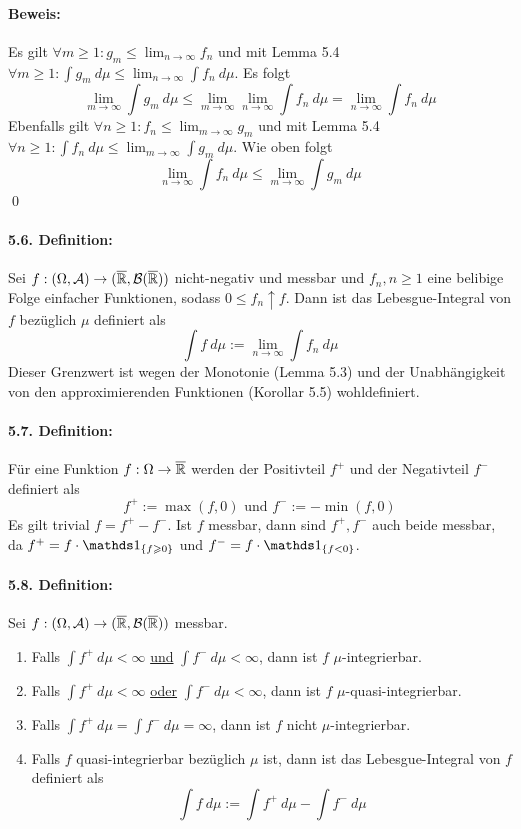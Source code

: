 \documentclass[12pt]{report}
\begin{document}
 \paragraph{Beweis:}Es gilt $\forall m\geq1:g_m\leq\displaystyle\lim_{n\to\infty}f_n$ und mit Lemma 5.4 $\displaystyle\forall m\geq1:\int g_m\ d\mu\leq\lim_{n\to\infty}\int f_n\ d\mu$. Es folgt 
 $$\lim_{m\to\infty}\int g_m\ d\mu\leq\lim_{m\to\infty}\lim_{n\to\infty}\int f_n\ d\mu=\lim_{n\to\infty}\int f_n\ d\mu$$
 Ebenfalls gilt $\forall n\geq1:f_n\leq\displaystyle\lim_{m\to\infty}g_m$ und mit Lemma 5.4 $\forall n\geq1:\displaystyle\int f_n\ d\mu\leq\lim_{m\to\infty}\int g_m\ d\mu$. Wie oben folgt
 $$\lim_{n\to\infty}\int f_n\ d\mu\leq\lim_{m\to\infty}\int g_m\ d\mu$$
 \qed
 
 \paragraph{5.6. Definition:}Sei $f:(\Omega,\mathcal{A})\to(\overline{\mathbb{R}},\mathcal{B}(\overline{\mathbb{R}}))$ nicht-negativ und messbar und $f_n,n\geq1$ eine belibige Folge einfacher Funktionen, sodass $0\leq f_n\uparrow f$. Dann ist das Lebesgue-Integral von $f$ bez\"uglich $\mu$ definiert als
 $$\int f\ d\mu:=\lim_{n\to\infty}\int f_n\ d\mu$$
 Dieser Grenzwert ist wegen der Monotonie (Lemma 5.3) und der Unabh\"angigkeit von den approximierenden Funktionen (Korollar 5.5) wohldefiniert. 
 
 \paragraph{5.7. Definition:}F\"ur eine Funktion $f:\Omega\to\overline{\mathbb{R}}$ werden der Positivteil $f^+$ und der Negativteil $f^-$ definiert als
 $$f^+:=\max(f,0)\text{ und }f^-:=-\min(f,0)$$
 Es gilt trivial $f=f^+-f^-$. Ist $f$ messbar, dann sind $f^+,f^-$ auch beide messbar, da $f^+=f\cdot\ind{\{f\geq0\}}$ und $f^-=f\cdot\ind{\{f<0\}}$.
 
 \paragraph{5.8. Definition:}Sei $f:(\Omega,\mathcal{A})\to(\overline{\mathbb{R}},\mathcal{B}(\overline{\mathbb{R}}))$ messbar.
 \begin{enumerate}[label=(\roman*)]
     \item Falls $\displaystyle\int f^+\ d\mu<\infty$ \underline{und} $\displaystyle\int f^-\ d\mu<\infty$, dann ist $f$ $\mu$-integrierbar.
     \item Falls $\displaystyle\int f^+\ d\mu<\infty$ \underline{oder} $\displaystyle\int f^-\ d\mu<\infty$, dann ist $f$ $\mu$-quasi-integrierbar.
     \item Falls $\displaystyle\int f^+\ d\mu=\displaystyle\int f^-\ d\mu=\infty$, dann ist $f$ nicht $\mu$-integrierbar.
     \item Falls $f$ quasi-integrierbar bez\"uglich $\mu$ ist, dann ist das Lebesgue-Integral von $f$ definiert als 
     $$\int f\ d\mu:=\int f^+\ d\mu-\int f^-\ d\mu$$
 \end{enumerate}
 
\end{document}
